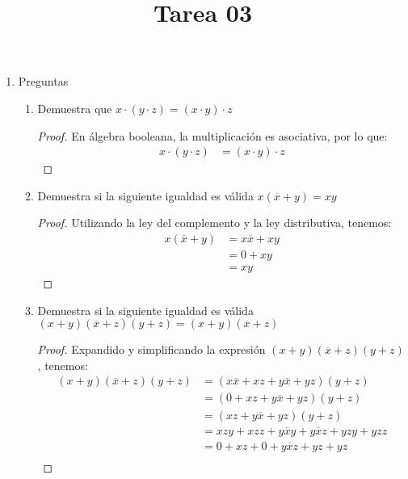 \documentclass{article}
\title{Tarea 03}
\author{}
\date{}
\begin{document}
\maketitle

\begin{enumerate}
    \item Preguntas
    \begin{enumerate}
        \item Demuestra que $x \cdot (y \cdot z) = (x \cdot y) \cdot z$
        \begin{proof}
            En álgebra booleana, la multiplicación es asociativa, por lo que:
            \begin{align*}
                x \cdot (y \cdot z) &= (x \cdot y) \cdot z
            \end{align*}
        \end{proof}
        \item Demuestra si la siguiente igualdad es válida $x(\overline{x} + y) = xy$
        \begin{proof}
            Utilizando la ley del complemento y la ley distributiva, tenemos:
            \begin{align*}
                x(\overline{x} + y) &= x\overline{x} + xy \\
                            &= 0 + xy \\
                            &= xy
            \end{align*}
        \end{proof}
        \item Demuestra si la siguiente igualdad es válida $(x + y)(\overline{x} + z)(y + z) = (x + y)(\overline{x} + z)$
        \begin{proof}
            Expandido y simplificando la expresión $(x + y)(\overline{x} + z)(y + z)$, tenemos:
            \begin{align*}
                (x + y)(\overline{x} + z)(y + z) &= (x\overline{x} + xz + y\overline{x} + yz)(y + z) \\
                                                &= (0 + xz + y\overline{x} + yz)(y + z) \\
                                                &= (xz + y\overline{x} + yz)(y + z) \\
                                                &= xz y + xz z + y\overline{x}y + y\overline{x}z + yz y + yz z \\
                                                &= 0 + xz + 0 + y\overline{x}z + yz + yz \\

\end{align*}
\end{proof}
\end{enumerate}
\end{enumerate}
\end{document}
